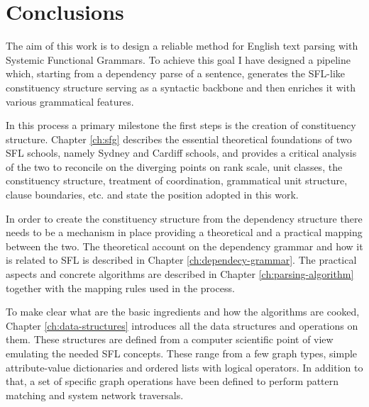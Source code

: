 \chapter{Conclusions}
\label{ch:conclusions}




The aim of this work is to design a reliable method for English text parsing with Systemic Functional Grammars. To achieve this goal I have designed a pipeline which, starting from a dependency parse of a sentence, generates the SFL-like constituency structure serving as a syntactic backbone and then enriches it with various grammatical features. 

In this process a primary milestone the first steps is the creation of constituency structure. Chapter \ref{ch:sfg} describes the essential theoretical foundations of two SFL schools, namely Sydney and Cardiff schools, and provides a critical analysis of the two to reconcile on the diverging points on rank scale, unit classes, the constituency structure, treatment of coordination, grammatical unit structure, clause boundaries, etc. and state the position adopted in this work. 

In order to create the constituency structure from the dependency structure there needs to be a mechanism in place providing a theoretical and a practical mapping between the two. The theoretical account on the dependency grammar and how it is related to SFL is described in Chapter \ref{ch:dependecy-grammar}. The practical aspects and concrete algorithms are described in Chapter \ref{ch:parsing-algorithm} together with the mapping rules used in the process. 

To make clear what are the basic ingredients and how the algorithms are cooked, Chapter \ref{ch:data-structures} introduces all the data structures and operations on them. These structures are defined from a computer scientific point of view emulating the needed SFL concepts. These range from a few graph types, simple attribute-value dictionaries and ordered lists with logical operators. In addition to that, a set of specific graph operations have been defined to perform pattern matching and system network traversals.

